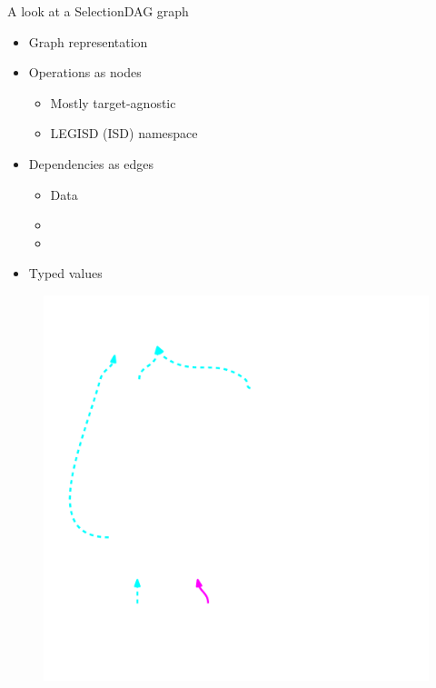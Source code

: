 \begin{frame}{A look at a SelectionDAG graph}

\begin{minipage}[t]{0.50\linewidth}
    \begin{itemize}
        \item Graph representation
        \item Operations as nodes
        \begin{itemize}
            \item Mostly target-agnostic
            \item LEGISD (ISD) namespace
        \end{itemize}
        \item Dependencies as edges
        \begin{itemize}
            \item Data
            \item {}
            \item {}
        \end{itemize}
        \item Typed values
    \end{itemize}
\end{minipage}
\begin{minipage}[t]{0.49\linewidth}
    \begin{figure}
        \vspace{-2.2ex}
        \includegraphics[width = 1.0\textwidth]{examples/ex1b/ex1b-pre-isel.pdf}
    \end{figure}
\end{minipage}

\end{frame}


